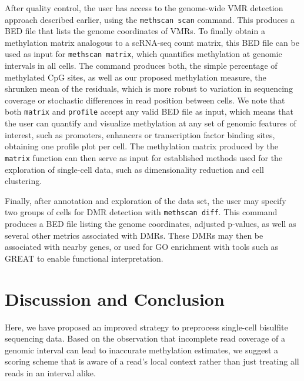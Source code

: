\documentclass[twocolumn,10pt]{article}
\newcommand{\new}[1]{#1} %
\begin{document}
After quality control, the user has access to the genome-wide VMR detection approach described earlier, using the \texttt{methscan scan} command.
This produces a BED file that lists the genome coordinates of VMRs.
To finally obtain a methylation matrix analogous to a scRNA-seq count matrix, this BED file can be used as input for \texttt{methscan matrix}, which quantifies methylation at genomic intervals in all cells.
The command produces both, the simple percentage of methylated CpG sites, as well as our proposed methylation measure, the shrunken mean of the residuals, which is more robust to variation in sequencing coverage or stochastic differences in read position between cells.
We note that both \texttt{matrix} and \texttt{profile} accept any valid BED file as input, which means that the user can quantify and visualize methylation at any set of genomic features of interest, such as promoters, enhancers or transcription factor binding sites, obtaining one profile plot per cell.
The methylation matrix produced by the \texttt{matrix} function can then serve as input for established methods used for the exploration of single-cell data, such as dimensionality reduction and cell clustering.

Finally, after annotation and exploration of the data set, the user may specify two groups of cells for DMR detection with \texttt{methscan diff}.
This command produces a BED file listing the genome coordinates, adjusted p-values, as well as several other metrics associated with DMRs.
These DMRs may then be associated with nearby genes, or used for GO enrichment with tools such as GREAT \citep{mclean2010great} to enable functional interpretation.


\section{Discussion and Conclusion}

Here, we have proposed an improved strategy to preprocess single-cell bisulfite sequencing data.
Based on the observation that incomplete read coverage of a genomic interval can lead to inaccurate methylation estimates, we suggest a scoring scheme that is aware of a read's local context rather than just treating all reads in an interval alike. 
\end{document}
